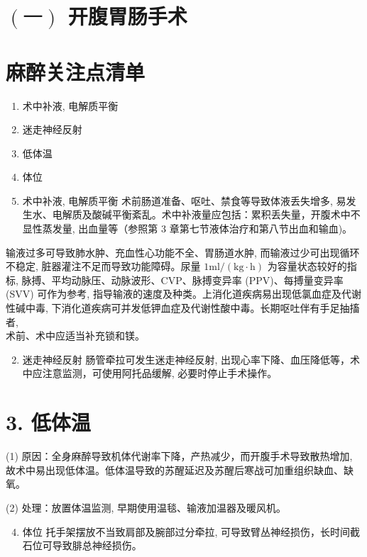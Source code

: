 \documentclass[10pt]{article}
\begin{document}
\section*{$(一)$ 开腹胃肠手术}
\section*{麻醉关注点清单}
\begin{enumerate}
  \item 术中补液, 电解质平衡

  \item 迷走神经反射

  \item 低体温

  \item 体位

  \item 术中补液, 电解质平衡 术前肠道准备、呕吐、禁食等导致体液丢失增多, 易发生水、电解质及酸碱平衡紊乱。术中补液量应包括：累积丢失量，开腹术中不显性蒸发量, 出血量等（参照第 3 章第七节液体治疗和第八节出血和输血)。

\end{enumerate}

输液过多可导致肺水肿、充血性心功能不全、胃肠道水肿, 而输液过少可出现循环不稳定, 脏器灌注不足而导致功能障碍。尿量 $1 \mathrm{ml} /(\mathrm{kg} \cdot \mathrm{h})$ 为容量状态较好的指标, 脉搏、平均动脉压、动脉波形、CVP、脉搏变异率 (PPV)、每搏量变异率 (SVV) 可作为参考, 指导输液的速度及种类。上消化道疾病易出现低氯血症及代谢性碱中毒, 下消化道疾病可并发低钾血症及代谢性酸中毒。长期呕吐伴有手足抽搐者,\\
术前、术中应适当补充锁和镁。

\begin{enumerate}
  \setcounter{enumi}{1}
  \item 迷走神经反射 肠管牵拉可发生迷走神经反射, 出现心率下降、血压降低等，术中应注意监测，可使用阿托品缓解, 必要时停止手术操作。
\end{enumerate}

\section*{3. 低体温}
(1) 原因：全身麻醉导致机体代谢率下降，产热减少，而开腹手术导致散热增加, 故术中易出现低体温。低体温导致的苏醒延迟及苏醒后寒战可加重组织缺血、缺氧。

(2) 处理：放置体温监测, 早期使用温毯、输液加温器及暖风机。

\begin{enumerate}
  \setcounter{enumi}{3}
  \item 体位 托手架摆放不当致肩部及腕部过分牵拉, 可导致臂丛神经损伤，长时间截石位可导致腓总神经损伤。
\end{enumerate}
\end{document}
